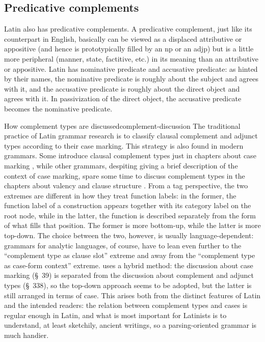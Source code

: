 \documentclass[UTF8, a4paper, oneside]{report}
\newcommand*{\citesec}[1]{\S~{#1}}
\newcommand*{\citechap}[1]{chap.~{#1}}
\begin{document}
\subsection{Predicative complements}

Latin also has predicative complements.
A predicative complement, just like its counterpart in English,
basically can be viewed as a displaced attributive or appositive 
(and hence is prototypically filled by an \ac{np} or an \acs{adjp})
but is a little more peripheral (manner, state, factitive, etc.) 
in its meaning than an attributive or appositive.
Latin has nominative predicate and accusative predicate:
as hinted by their names, 
the nominative predicate is roughly about the subject and agrees with it,
and the accusative predicate is roughly about the direct object and agrees with it.
In passivization of the direct object,
the accusative predicate becomes the nominative predicate.



\begin{theorybox}{How complement types are discussed}{complement-discussion}
    The traditional practice of Latin grammar research
    is to classify clausal complement and adjunct types according to their case marking.
    This strategy is also found in modern grammars.
    Some introduce clausal complement types just in chapters about case marking 
    \citep[\citechap{8}]{jacques2021grammar},
    while other grammars, despiting giving a brief description of the context of case marking,
    spare some time to discuss complement types in the chapters about valency and clause structure 
    \citep[\citesec{3.4}, \citechap{19}, \citechap{22}]{forker2020grammar}.
    From a \ac{tag} perspective, 
    the two extremes are different in how they treat function labels:
    in the former, the function label of a construction appears together with its category label on the root node,
    while in the latter, the function is described separately from the form of what fills that position.
    The former is more bottom-up, 
    while the latter is more top-down.
    The choice between the two, however, is usually language-dependent:
    grammars for analytic languages, of course, have to lean even further to the 
    ``complement type as clause slot'' extreme 
    and away from the ``complement type as case-form context'' extreme.
    \citet{allen1903allen} uses a hybrid method:
    the discussion about case marking (\citesec{39}) is separated from 
    the discussion about complement and adjunct types (\citesec{338}),
    so the top-down approach seems to be adopted,
    but the latter is still arranged in terms of case.
    This arises both from the distinct features of Latin and the intended readers:
    the relation between complement types and cases is regular enough in Latin,
    and what is most important for Latinists is to understand, at least sketchily, ancient writings, 
    so a parsing-oriented grammar is much handier.
\end{theorybox}
\end{document}
